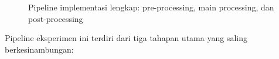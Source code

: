 \begin{figure}[H]
    \centering
    \caption{Pipeline implementasi lengkap: pre-processing, main processing, dan post-processing}
    \label{fig:implementation_pipeline}
\end{figure}

Pipeline eksperimen ini terdiri dari tiga tahapan utama yang saling berkesinambungan:

